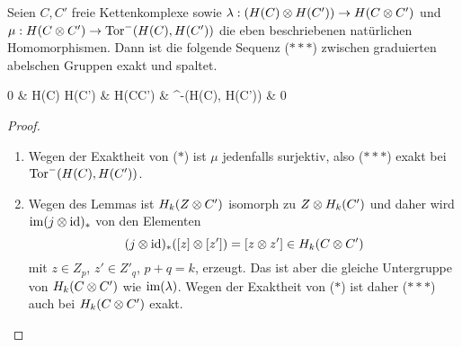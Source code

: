 \begin{satz}
	Seien $C,C'$ freie Kettenkomplexe sowie $\lambda : (H(C) \otimes H(C')) \rightarrow H(C\otimes C')$ und $\mu : H(C\otimes C') \rightarrow \mathrm{Tor}^{-}(H(C), H(C'))$ die eben beschriebenen natürlichen Homomorphismen.
	Dann ist die folgende Sequenz ($\ast \ast \ast$) zwischen graduierten abelschen Gruppen exakt und spaltet.
	\begin{cd*}
	0 \ar[r]
	& H(C) \tensor H(C') \ar[r, "\lambda"]
	& H(C\tensor C') \ar[r, "\mu"]
	& \Tor^{-}(H(C), H(C')) \ar[r]
	& 0
	\end{cd*}
\end{satz}
\begin{proof}
\begin{enumerate}
	\item Wegen der Exaktheit von ($\ast$) ist $\mu$ jedenfalls surjektiv, also ($\ast \ast \ast$) exakt bei $\mathrm{Tor}^{-}(H(C), H(C'))$.
	\item Wegen des Lemmas ist $H_k(Z \otimes C')$ isomorph zu $Z \otimes H_k(C')$ und daher wird $\operatorname{im} (j \otimes \operatorname{id})_{\ast}$ von den Elementen
	\begin{equation*}
		(j\otimes \operatorname{id})_{\ast} ([z]\otimes[z']) = [z \otimes z'] \in H_k(C \otimes C')
	\end{equation*}
	mit $z \in Z_p$, $z' \in Z'_q$, $p+q =k$, erzeugt.
	Das ist aber die gleiche Untergruppe von $H_k(C\otimes C')$ wie $\operatorname{im}(\lambda)$.
	Wegen der Exaktheit von ($\ast$) ist daher ($\ast \ast \ast$) auch bei $H_k(C\otimes C')$ exakt.
\end{enumerate}
\end{proof}